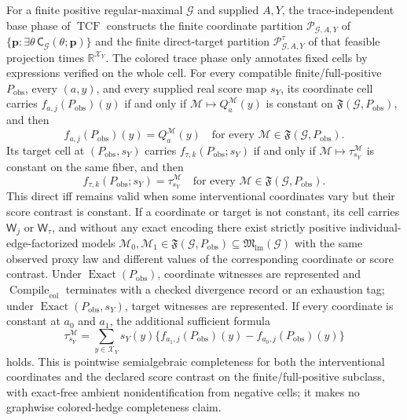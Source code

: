 For a finite positive regular-maximal \(\mathcal G\) and supplied \(A,Y\), the trace-independent base phase of \(\operatorname{TCF}\) constructs the finite coordinate partition \(\mathscr P_{\mathcal G,A,Y}\) of \(\{\mathbf p:\exists\theta\,\mathsf C_{\mathcal G}(\theta;\mathbf p)\}\) and the finite direct-target partition \(\mathscr P^{\tau}_{\mathcal G,A,Y}\) of that feasible projection times \(\mathbb R^{\mathcal X_Y}\). The colored trace phase only annotates fixed cells by expressions verified on the whole cell. For every compatible finite/full-positive \(P_{\mathrm{obs}}\), every \((a,y)\), and every supplied real score map \(s_Y\), its coordinate cell carries \(f_{a,j}(P_{\mathrm{obs}})(y)\) if and only if \(\mathcal M\mapsto Q_a^{\mathcal M}(y)\) is constant on \(\mathfrak F(\mathcal G,P_{\mathrm{obs}})\), and then
\[
f_{a,j}(P_{\mathrm{obs}})(y)=Q_a^{\mathcal M}(y)
\quad\text{for every }\mathcal M\in\mathfrak F(\mathcal G,P_{\mathrm{obs}}).
\]
Its target cell at \((P_{\mathrm{obs}},s_Y)\) carries \(f_{\tau,k}(P_{\mathrm{obs}};s_Y)\) if and only if \(\mathcal M\mapsto\tau_{s_Y}^{\mathcal M}\) is constant on the same fiber, and then
\[
f_{\tau,k}(P_{\mathrm{obs}};s_Y)=\tau_{s_Y}^{\mathcal M}
\quad\text{for every }\mathcal M\in\mathfrak F(\mathcal G,P_{\mathrm{obs}}).
\]
This direct iff remains valid when some interventional coordinates vary but their score contrast is constant. If a coordinate or target is not constant, its cell carries \(\mathsf W_j\) or \(\mathsf W_{\tau}\), and without any exact encoding there exist strictly positive individual-edge-factorized models \(\mathcal M_0,\mathcal M_1\in\mathfrak F(\mathcal G,P_{\mathrm{obs}})\subseteq\mathfrak M_{\mathrm{lm}}(\mathcal G)\) with the same observed proxy law and different values of the corresponding coordinate or score contrast. Under \(\operatorname{Exact}(P_{\mathrm{obs}})\), coordinate witnesses are represented and \(\operatorname{Compile}_{\mathrm{col}}\) terminates with a checked divergence record or an exhaustion tag; under \(\operatorname{Exact}(P_{\mathrm{obs}},s_Y)\), target witnesses are represented. If every coordinate is constant at \(a_0\) and \(a_1\), the additional sufficient formula
\[
\tau_{s_Y}^{\mathcal M}
=\sum_{y\in\mathcal X_Y}s_Y(y)
\{f_{a_1,j}(P_{\mathrm{obs}})(y)-f_{a_0,j}(P_{\mathrm{obs}})(y)\}
\]
holds. This is pointwise semialgebraic completeness for both the interventional coordinates and the declared score contrast on the finite/full-positive subclass, with exact-free ambient nonidentification from negative cells; it makes no graphwise colored-hedge completeness claim.